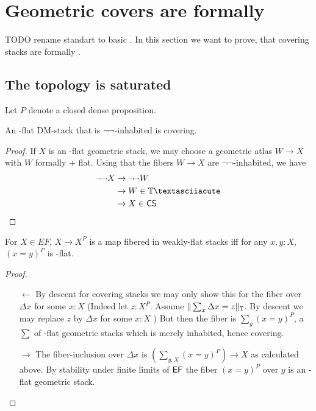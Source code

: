 \section{Geometric covers are formally \etale}
TODO rename standart \etale to basic \etale.
In this section we want to prove, that covering stacks are formally \etale.
\subsection{The \etale topology is saturated}
Let $P$ denote a closed dense proposition.
\begin{lemma}{\label{lemma:covOfEF}}
	An \etale-flat DM-stack that is $\lnot \lnot$-inhabited is covering.
\end{lemma}
\begin{proof}
	If $X$ is an \etale-flat geometric stack, we may choose a geometric atlas $W \to X$ with $W$ formally \etale + flat. Using that the fibers $W \to X$ are $\lnot \lnot$-inhabited, we have 
	\begin{align*}
		\lnot \lnot X &\to \lnot \lnot W \\
		&\to W \in \bT  ´\\
		&\to X \in \CS \\
	\end{align*}
\end{proof}
\begin{lemma}{\label{lemma:wfcover}}
	For $X \in EF$, $X \to X^P$ is a map fibered in weakly-flat stacks iff for any $x, y : X$, $(x = y)^P$ is \etale-flat.
\end{lemma}
\begin{proof}
	\begin{itemize}
		
		\item[$\leftarrow$]
		By descent for covering stacks we may only show this for the fiber over $\Delta x $ for some $x  : X$ (Indeed let $z : X^P$. Assume $\|\sum_x \Delta x = z \|_{\mathbb{T}}$. By descent we may replace $z$ by $\Delta x$ for some $x : X$ ) 
		But then the fiber is $\sum_y (x = y)^P$, a $\sum$ of \etale-flat geometric stacks which is merely inhabited, hence covering.
		\item[$\rightarrow$]The fiber-inclusion over $\Delta x$ is $(\sum_{y : X} (x = y)^P) \to X$ as calculated above. By stability under finite limits of $\mathsf{EF}$ the fiber $(x = y)^P$ over $y$ is an \etale-flat geometric stack.
	\end{itemize}
\end{proof}
